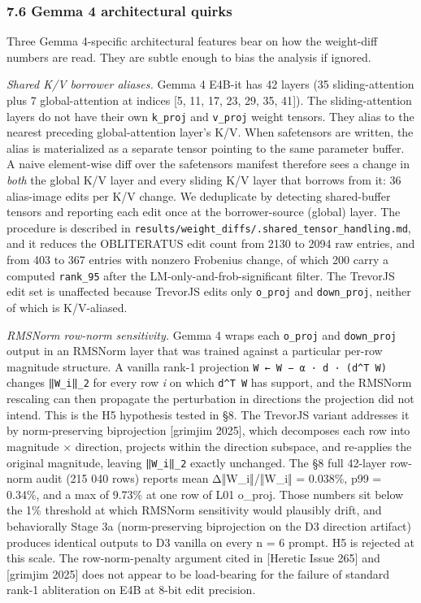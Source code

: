 \documentclass[
  11pt,
]{article}
\begin{document}
\subsubsection{7.6 Gemma 4 architectural
quirks}\label{gemma-4-architectural-quirks-1}

Three Gemma 4-specific architectural features bear on how the
weight-diff numbers are read. They are subtle enough to bias the
analysis if ignored.

\emph{Shared K/V borrower aliases.} Gemma 4 E4B-it has 42 layers (35
sliding-attention plus 7 global-attention at indices {[}5, 11, 17, 23,
29, 35, 41{]}). The sliding-attention layers do not have their own
\texttt{k\_proj} and \texttt{v\_proj} weight tensors. They alias to the
nearest preceding global-attention layer's K/V. When safetensors are
written, the alias is materialized as a separate tensor pointing to the
same parameter buffer. A naive element-wise diff over the safetensors
manifest therefore sees a change in \emph{both} the global K/V layer and
every sliding K/V layer that borrows from it: 36 alias-image edits per
K/V change. We deduplicate by detecting shared-buffer tensors and
reporting each edit once at the borrower-source (global) layer. The
procedure is described in
\texttt{results/weight\_diffs/.shared\_tensor\_handling.md}, and it
reduces the OBLITERATUS edit count from 2130 to 2094 raw entries, and
from 403 to 367 entries with nonzero Frobenius change, of which 200
carry a computed \texttt{rank\_95} after the
LM-only-and-frob-significant filter. The TrevorJS edit set is unaffected
because TrevorJS edits only \texttt{o\_proj} and \texttt{down\_proj},
neither of which is K/V-aliased.

\emph{RMSNorm row-norm sensitivity.} Gemma 4 wraps each \texttt{o\_proj}
and \texttt{down\_proj} output in an RMSNorm layer that was trained
against a particular per-row magnitude structure. A vanilla rank-1
projection \texttt{W\ ←\ W\ −\ α\ ·\ d\ ·\ (d\^{}T\ W)} changes
\texttt{‖W\_i‖\_2} for every row \emph{i} on which \texttt{d\^{}T\ W}
has support, and the RMSNorm rescaling can then propagate the
perturbation in directions the projection did not intend. This is the H5
hypothesis tested in §8. The TrevorJS variant addresses it by
norm-preserving biprojection {[}grimjim 2025{]}, which decomposes each
row into magnitude × direction, projects within the direction subspace,
and re-applies the original magnitude, leaving \texttt{‖W\_i‖\_2}
exactly unchanged. The §8 full 42-layer row-norm audit (215 040 rows)
reports mean Δ‖W\_i‖/‖W\_i‖ = 0.038\%, p99 = 0.34\%, and a max of 9.73\%
at one row of L01 o\_proj. Those numbers sit below the 1\% threshold at
which RMSNorm sensitivity would plausibly drift, and behaviorally Stage
3a (norm-preserving biprojection on the D3 direction artifact) produces
identical outputs to D3 vanilla on every n = 6 prompt. H5 is rejected at
this scale. The row-norm-penalty argument cited in {[}Heretic Issue
265{]} and {[}grimjim 2025{]} does not appear to be load-bearing for the
failure of standard rank-1 abliteration on E4B at 8-bit edit precision.
\end{document}
